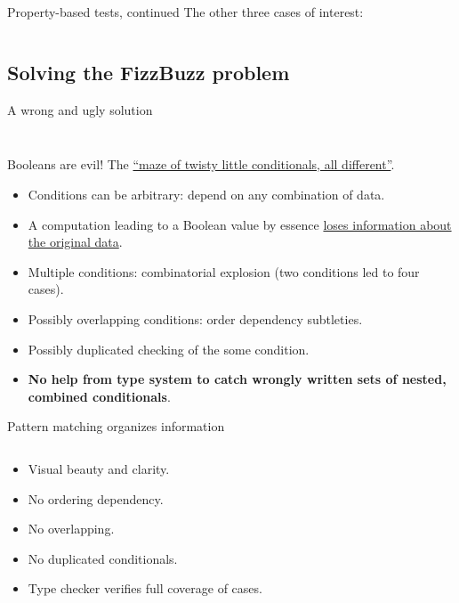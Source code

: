 \begin{frame}[fragile]{Property-based tests, continued}
  The other three cases of interest:

  \inputminted{scala}{FizzBuzzSpec3.scala}
\end{frame}

\subsection{Solving the FizzBuzz problem}

\begin{frame}[fragile]{A wrong and ugly solution}
  \inputminted[gobble=2]{scala}{FizzBuzzIf.scala}

  \inputminted{console}{testQuick3.console}
\end{frame}

\begin{frame}{Booleans are evil!}
  The \href{http://en.wikiquote.org/wiki/Colossal\_Cave\_Adventure}{``maze of twisty little conditionals, all different''}.

  \begin{itemize}
  \item Conditions can be arbitrary: depend on \alert{any} combination of data.
  \item A computation leading to a Boolean value by essence \href{http://existentialtype.wordpress.com/2011/03/15/boolean-blindness/}{loses information about the original data}.
  \item Multiple conditions: combinatorial explosion (two conditions led to four cases).
  \item Possibly overlapping conditions: order dependency subtleties.
  \item Possibly duplicated checking of the some condition.
  \item \textbf{No help from type system to catch wrongly written sets of nested, combined conditionals}.
  \end{itemize}

\end{frame}

\begin{frame}[fragile]{Pattern matching organizes information}
  \inputminted[gobble=2]{scala}{FizzBuzz2.scala}

  \begin{itemize}
  \item Visual \alert{beauty} and clarity.
  \item No ordering dependency.
  \item No overlapping.
  \item No duplicated conditionals.
  \item \alert{Type checker} verifies \alert{full coverage} of cases.
  \end{itemize}
\end{frame}

